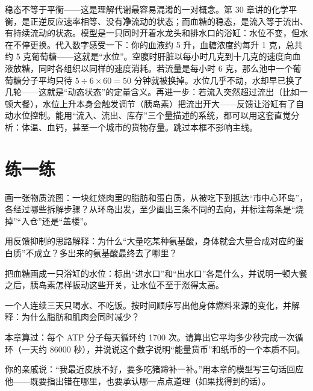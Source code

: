 \begin{tiaozhan}
稳态不等于平衡——这是理解代谢最容易混淆的一对概念。第 30 章讲的化学平衡，是正逆反应速率相等、没有\textbf{净}流动的状态；而血糖的稳态，是流入等于流出、有持续流动的状态。模型是一只同时开着水龙头和排水口的浴缸：水位不变，但水在不停更换。代入数字感受一下：你的血液约 5 升，血糖浓度约每升 1 克，总共约 5 克葡萄糖——这就是“水位”。空腹时肝脏以每小时几克到十几克的速度向血液放糖，同时各组织以同样的速度消耗。若流量是每小时 6 克，那么池中一个葡萄糖分子平均只待 $5 \div 6 \times 60 = 50$ 分钟就被换掉。水位几乎不动，水却早已换了几轮——这就是“动态状态”的定量含义。再进一步：若流入突然超过流出（比如一顿大餐），水位上升本身会触发调节（胰岛素）把流出开大——反馈让浴缸有了自动水位控制。能用“流入、流出、库存”三个量描述的系统，都可以用这套直觉分析：体温、血钙，甚至一个城市的货物存量。跳过本框不影响主线。
\end{tiaozhan}

\section*{练一练}

\begin{sikaoti}
\item 画一张物质流图：一块红烧肉里的脂肪和蛋白质，从被吃下到抵达“市中心环岛”，各经过哪些拆解步骤？从环岛出发，至少画出三条不同的去向，并标注每条是“烧掉”“入仓”还是“盖楼”。
\item 用反馈抑制的思路解释：为什么“大量吃某种氨基酸，身体就会大量合成对应的蛋白质”不成立？多出来的氨基酸最终去了哪里？
\item 把血糖画成一只浴缸的水位：标出“进水口”和“出水口”各是什么，并说明一顿大餐之后，胰岛素怎样扳动这些开关，让水位不至于涨得太高。
\item 一个人连续三天只喝水、不吃饭。按时间顺序写出他身体燃料来源的变化，并解释：为什么脂肪和肌肉会同时减少？
\item 本章算过：每个 ATP 分子每天循环约 1700 次。请算出它平均多少秒完成一次循环（一天约 86000 秒），并说说这个数字说明“能量货币”和纸币的一个本质不同。
\item 你的亲戚说：“我最近皮肤不好，要多吃猪蹄补一补。”用本章的模型写三句话回应他——既要指出错在哪里，也要承认哪一点点道理（如果找得到的话）。
\end{sikaoti}
